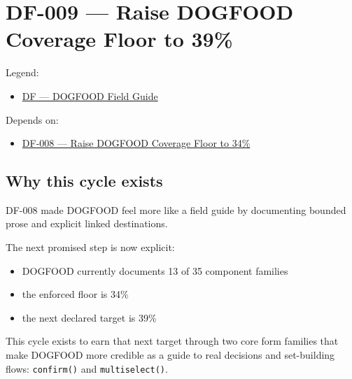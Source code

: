 \chapter{DF-009 --- Raise DOGFOOD Coverage Floor to 39\%}\label{record-071}

\smallskip

Legend:

\begin{itemize}
\tightlist
\item
  \href{https://github.com/flyingrobots/bijou/blob/1853ad902f6bf219326409e7f743a5a1d6517dbc/docs/legends/DF-dogfood-field-guide.md}{DF --- DOGFOOD Field Guide}
\end{itemize}

Depends on:

\begin{itemize}
\tightlist
\item
  \href{https://github.com/flyingrobots/bijou/blob/cbd70612140e7a450d764b3c7be1c6af878b99bc/docs/design/DF-008-raise-dogfood-coverage-floor-to-34-percent.md}{DF-008 --- Raise DOGFOOD Coverage Floor to 34\%}
\end{itemize}

\section{Why this cycle exists}\label{record-071-why-this-cycle-exists}

DF-008 made DOGFOOD feel more like a field guide by documenting bounded prose and explicit linked destinations.

The next promised step is now explicit:

\begin{itemize}
\tightlist
\item
  DOGFOOD currently documents 13 of 35 component families
\item
  the enforced floor is 34\%
\item
  the next declared target is 39\%
\end{itemize}

This cycle exists to earn that next target through two core form families that make DOGFOOD more credible as a guide to real decisions and set-building flows: \texttt{c\allowbreak{}o\allowbreak{}n\allowbreak{}f\allowbreak{}i\allowbreak{}r\allowbreak{}m\allowbreak{}(\allowbreak{})} and \texttt{m\allowbreak{}u\allowbreak{}l\allowbreak{}t\allowbreak{}i\allowbreak{}s\allowbreak{}e\allowbreak{}l\allowbreak{}e\allowbreak{}c\allowbreak{}t\allowbreak{}(\allowbreak{})}.

